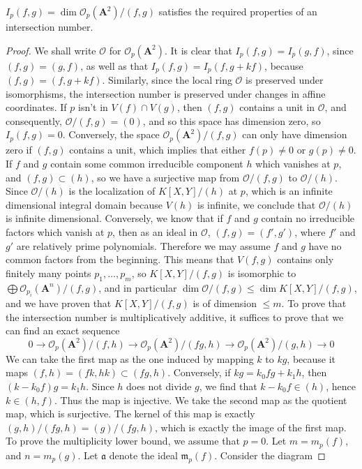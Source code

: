 \begin{theorem}
    $I_p(f,g) = \dim \mathcal{O}_p(\mathbf{A}^2)/(f,g)$ satisfies the required properties of an intersection number.
\end{theorem}
\begin{proof}
    We shall write $\mathcal{O}$ for $\mathcal{O}_p(\mathbf{A}^2)$. It is clear that $I_p(f,g) = I_p(g,f)$, since $(f,g) = (g,f)$, as well as that $I_p(f,g) = I_p(f,g + kf)$, because $(f,g) = (f,g + kf)$. Similarly, since the local ring $\mathcal{O}$ is preserved under isomorphisms, the intersection number is preserved under changes in affine coordinates. If $p$ isn't in $V(f) \cap V(g)$, then $(f,g)$ contains a unit in $\mathcal{O}$, and consequently, $\mathcal{O}/(f,g) = (0)$, and so this space has dimension zero, so $I_p(f,g) = 0$. Conversely, the space $\mathcal{O}_p(\mathbf{A}^2)/(f,g)$ can only have dimension zero if $(f,g)$ contains a unit, which implies that either $f(p) \neq 0$ or $g(p) \neq 0$. If $f$ and $g$ contain some common irreducible component $h$ which vanishes at $p$, and $(f,g) \subset (h)$, so we have a surjective map from $\mathcal{O}/(f,g)$ to $\mathcal{O}/(h)$. Since $\mathcal{O}/(h)$ is the localization of $K[X,Y]/(h)$ at $p$, which is an infinite dimensional integral domain because $V(h)$ is infinite, we conclude that $\mathcal{O}/(h)$ is infinite dimensional. Conversely, we know that if $f$ and $g$ contain no irreducible factors which vanish at $p$, then as an ideal in $\mathcal{O}$, $(f,g) = (f',g')$, where $f'$ and $g'$ are relatively prime polynomials. Therefore we may assume $f$ and $g$ have no common factors from the beginning. This means that $V(f,g)$ contains only finitely many points $p_1, \dots, p_m$, so $K[X,Y]/(f,g)$ is isomorphic to $\bigoplus \mathcal{O}_{p_i}(\mathbf{A}^n)/(f,g)$, and in particular $\dim \mathcal{O}/(f,g) \leq \dim K[X,Y]/(f,g)$, and we have proven that $K[X,Y]/(f,g)$ is of dimension $\leq m$. To prove that the intersection number is multiplicatively additive, it suffices to prove that we can find an exact sequence
    \[ 0 \to \mathcal{O}_p(\mathbf{A}^2)/(f,h) \to \mathcal{O}_p(\mathbf{A}^2)/(fg,h) \to \mathcal{O}_p(\mathbf{A}^2)/(g,h) \to 0 \]
    We can take the first map as the one induced by mapping $k$ to $kg$, because it maps $(f,h) = (fk,hk) \subset (fg,h)$. Conversely, if $kg = k_0fg + k_1h$, then $(k - k_0f)g = k_1h$. Since $h$ does not divide $g$, we find that $k - k_0f \in (h)$, hence $k \in (h,f)$. Thus the map is injective. We take the second map as the quotient map, which is surjective. The kernel of this map is exactly $(g,h)/(fg,h) = (g)/(fg,h)$, which is exactly the image of the first map. To prove the multiplicity lower bound, we assume that $p = 0$. Let $m = m_p(f)$, and $n = m_p(g)$. Let $\mathfrak{a}$ denote the ideal $\mathfrak{m}_p(f)$. Consider the diagram

\end{proof}
